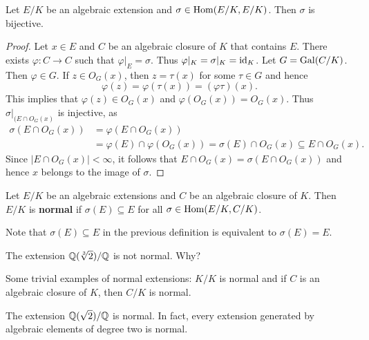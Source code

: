 \chapter{}


\begin{proposition}
    Let $E/K$ be an algebraic extension and $\sigma\in\operatorname{Hom}(E/K,E/K)$. 
    Then $\sigma$ is bijective. 
\end{proposition}

\begin{proof}
    Let $x\in E$ and 
    $C$ be an algebraic closure of $K$ that contains $E$. There
    exists $\varphi\colon C\to C$ such that $\varphi|_E=\sigma$. 
    Thus $\varphi|_K=\sigma|_K=\operatorname{id}_K$. Let $G=\operatorname{Gal}(C/K)$. Then  
    $\varphi\in G$. If $z\in O_G(x)$, 
    then $z=\tau(x)$ for some $\tau\in G$ and hence
    \[
    \varphi(z)=\varphi(\tau(x))=(\varphi\tau)(x). 
    \]
    This implies that $\varphi(z)\in O_G(x)$ 
    and $\varphi(O_G(x))=O_G(x)$. Thus $\sigma|_{(E\cap O_G(x)}$ is injective, as 
    \begin{align*}
    \sigma(E\cap O_G(x))&=\varphi(E\cap O_G(x))\\
    &=\varphi(E)\cap\varphi(O_G(x))
    =\sigma(E)\cap O_G(x)\subseteq E\cap O_G(x).
    \end{align*}
    Since $|E\cap O_G(x)|<\infty$, it follows that $E\cap O_G(x)=\sigma(E\cap O_G(x))$ and
    hence $x$ belongs to the image of $\sigma$. 
\end{proof}


\begin{definition}
    Let $E/K$ be an algebraic extensions and $C$ be an algebraic closure of $K$. 
    Then $E/K$ is \textbf{normal} if 
    $\sigma(E)\subseteq E$ for all $\sigma\in\operatorname{Hom}(E/K,C/K)$. 
\end{definition}

Note that $\sigma(E)\subseteq E$ in the previous definition
is equivalent to $\sigma(E)=E$. 

\begin{example}
    The extension $\mathbb{Q}(\sqrt[3]{2})/\mathbb{Q}$ is not normal. Why?
\end{example}

Some trivial examples of normal extensions: $K/K$ is normal
and if $C$ is an algebraic closure of $K$, then $C/K$ is normal. 

\begin{example}
    The extension $\mathbb{Q}(\sqrt{2})/\mathbb{Q}$ is normal. In fact, 
    every extension generated by algebraic elements of degree two is normal. 
\end{example}

